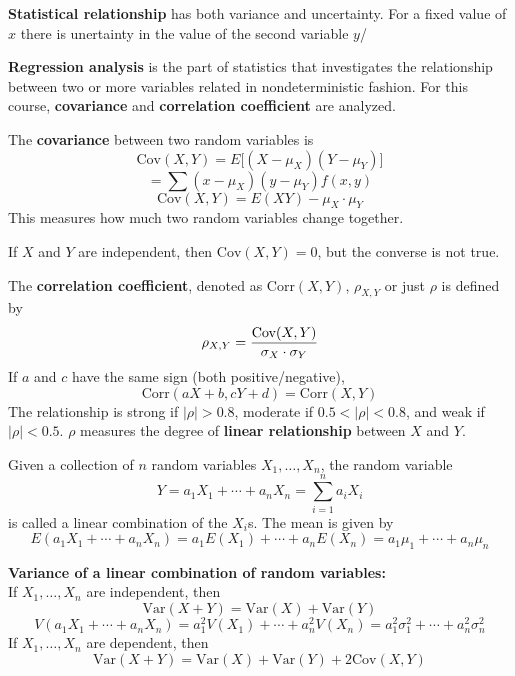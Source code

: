 \documentclass[english, 12pt]{article}
\begin{document}
\begin{defn}
\textbf{Statistical relationship} has both variance and uncertainty. For a fixed value of $x$ there is unertainty in the value of the second variable $y$/
\end{defn}

\begin{defn}
\textbf{Regression analysis} is the part of statistics that investigates the relationship between two or more variables related in nondeterministic fashion. For this course, \textbf{covariance} and \textbf{correlation coefficient} are analyzed.
\end{defn}

\begin{defn}
The \textbf{covariance} between two random variables is
\[\text{Cov}(X,Y) = E \lbrack (X - \mu_X)(Y - \mu_Y) \rbrack\]
\[= \sum (x - \mu_X)(y-\mu_Y) f(x,y)\]
\[\text{Cov}(X,Y) = E(XY) - \mu_X \cdot \mu_Y\]
This measures how much two random variables change together.
\end{defn}

\begin{note}
If $X$ and $Y$ are independent, then $\text{Cov}(X,Y) = 0$, but the converse is not true.
\end{note}

\begin{defn}
The \textbf{correlation coefficient}, denoted as $\text{Corr}(X,Y)$, $\rho_{X,Y}$ or just $\rho$ is defined by
\[\rho_{X,Y} = \frac{\text{Cov}(X,Y)}{\sigma_X \cdot \sigma_Y}\]
If $a$ and $c$ have the same sign (both positive/negative),
\[\text{Corr}(aX+b,cY+d) = \text{Corr}(X,Y)\]
The relationship is strong if $|\rho| > 0.8$, moderate if $0.5 < |\rho| < 0.8$, and weak if $|\rho| < 0.5$.
$\rho$ measures the degree of \textbf{linear relationship} between $X$ and $Y$.
\end{defn}


\begin{defn}
Given a collection of $n$ random variables $X_1,\dots,X_n$, the random variable
\[Y = a_1 X_1 + \cdots + a_n X_n = \sum_{i=1}^n a_{i} X_i\]
is called a linear combination of the $X_{i}$s. The mean is given by
\[E(a_1 X_1 + \cdots + a_n X_n) = a_1 E(X_1) + \cdots + a_n E(X_n) = a_1 \mu_1 + \cdots + a_n \mu_n\]
\end{defn}

\begin{thrm}
\textbf{Variance of a linear combination of random variables:} \\
If $X_1,\dots,X_n$ are independent, then
\[\text{Var}(X+Y) = \text{Var}(X) + \text{Var}(Y)\]
\[V(a_1 X_1 + \cdots + a_n X_n) = a_{1}^2 V(X_1) + \cdots + a_{n}^2 V(X_n) = a_{1}^2 \sigma_{1}^2 + \cdots + a_{n}^2 \sigma_{n}^2\]
If $X_1,\dots,X_n$ are dependent, then
\[\text{Var}(X+Y) = \text{Var}(X) + \text{Var}(Y) + 2 \text{Cov}(X,Y)\]
\end{thrm}
\end{document}
